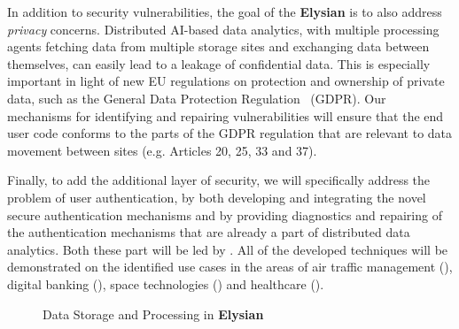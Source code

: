 \documentclass[a4paper,11pt]{article}
\newcommand{\project}[1]{\textbf{#1}\xspace}
\newcommand{\SECURITY}{\project{Elysian}}
\newcommand{\TheProject}{\SECURITY}
\begin{document}
In addition to security vulnerabilities, the goal of the \TheProject{} is to also address \emph{privacy} concerns. Distributed AI-based data analytics, with multiple processing agents fetching data from multiple storage sites and exchanging data between themselves, can easily lead to a leakage of confidential data. This is especially important in light of new EU regulations on protection and ownership of private data, such as the General Data Protection Regulation~\cite{gdpr} (GDPR). Our mechanisms for identifying and repairing vulnerabilities will ensure that the end user code conforms to the parts of the GDPR regulation that are relevant to data movement between sites (e.g. Articles 20, 25, 33 and 37). 

Finally, to add the additional layer of security, we will specifically address the problem of user authentication, by both developing and integrating the novel secure authentication mechanisms and by providing diagnostics and repairing of the authentication mechanisms that are already a part of distributed data analytics. Both these part will be led by \COGNIshort{}. All of the developed techniques will be demonstrated on the identified use cases in the areas of air traffic management (\FRQshort{}), digital banking (\SOPRAshort{}), space technologies (\SOPRAshort{}) and healthcare (\SOPRAshort{}). 



\begin{figure}[tph!]
  \begin{center}
  \vspace{-5mm}
  \vspace{-1.5cm}
  \caption{Data Storage and Processing in \TheProject{}}
  \label{fig:storageprocessing}
  \end{center}
  \end{figure}
\end{document}
